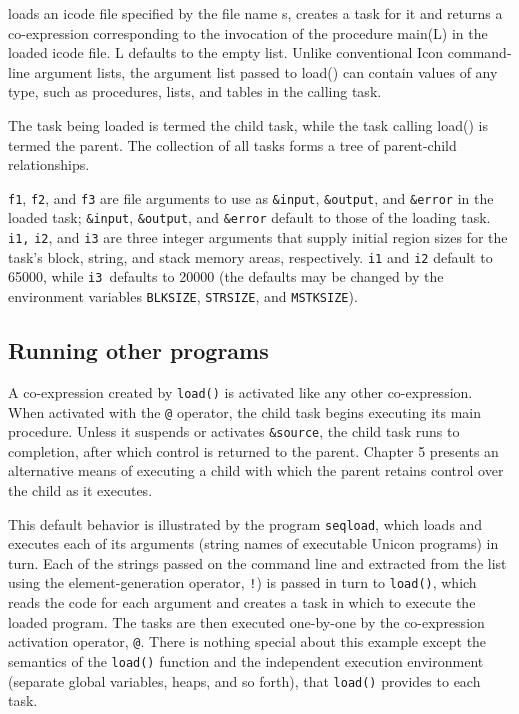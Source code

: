 \noindent loads an icode file \cite{Gris86} specified by the file name
\textrm{s}, creates a task for it and returns a co-expression corresponding to
the invocation of the procedure {\textrm{main(L)}} in the
loaded icode file.  {\textrm{L}}{
}defaults to the empty list. Unlike conventional Icon command-line argument
lists, the argument list passed to{
}{\textrm{load()}} can contain values of any type, such as
procedures, lists, and tables in the calling task.

The task being loaded is termed the child task, while the task calling
{\textrm{load()}} is termed the parent. The
collection of all tasks forms a tree of parent-child
relationships.

{\texttt{f1}}, {\texttt{f2}},
and {\texttt{f3}}{ }are file
arguments to use as {\texttt{\&input}},
{\texttt{\&output}}, and
{\texttt{\&error}} in the loaded task;
{\texttt{\&input}},
{\texttt{\&output}}, and
{\texttt{\&error}}{\textrm{
}}default to those of the loading task.{\textrm{
}}{\texttt{i1,}} {\texttt{i2}},
and {\texttt{i3}} are three integer arguments that
supply initial region sizes for the task's block,
string, and stack memory areas, respectively.
{\texttt{i1}} and {\texttt{i2}}
default to 65000, while {\texttt{i3 }}defaults to
20000 (the defaults may be changed by the environment variables
{\texttt{BLKSIZE}},
{\texttt{STRSIZ}}\texttt{E}, and
{\texttt{MSTKSIZE}}).

\subsection*{Running other programs}

A co-expression created by {\texttt{load()}} is
activated like any other co-expression. When activated with the
{\texttt{@}} operator, the child task begins
executing its main procedure. Unless it suspends or activates
{\texttt{\&source}}, the child task runs to
completion, after which control is returned to the parent. Chapter 5
presents an alternative means of executing a child with which the
parent retains control over the child as it executes.

This default behavior is illustrated by the program
\texttt{seqload}, which loads and executes each
of its arguments (string names of executable Unicon programs) in turn.
Each of the strings passed on the command line and extracted from the
list using the element-generation operator,
{\texttt{!}}) is passed in turn to
{\texttt{load()}}, which reads the code for each argument
and creates a task in which to execute the loaded program. The tasks
are then executed one-by-one by the co-expression activation operator,
{\texttt{@}}. There is
nothing special about this example except the semantics of the
{\texttt{load()}} function and the independent
execution environment (separate global variables, heaps, and so forth),
that {\texttt{load()}} provides to each task.

